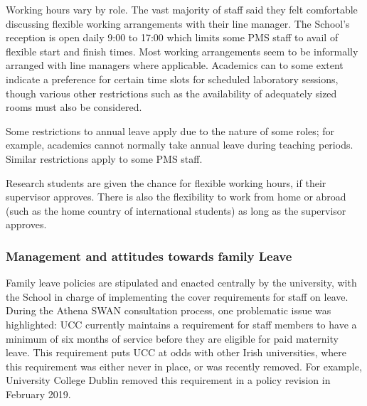 Working hours vary by role. The vast majority of staff said they felt comfortable discussing flexible working arrangements with their line manager. The School's reception is open daily 9:00 to 17:00 which limits some PMS staff to avail of flexible start and finish times. Most working arrangements seem to be informally arranged with line managers where applicable.  
Academics can to some extent indicate a preference for certain time slots for scheduled laboratory sessions, though various other restrictions such as the availability of adequately sized rooms must also be considered. 



Some restrictions to annual leave apply due to the nature of some roles; for example, academics cannot normally take annual leave during teaching periods. Similar restrictions apply to some PMS staff. 

Research students are given the chance for flexible working hours, if their supervisor approves. There is also the flexibility to work from home or abroad (such as the home country of international students) as long as the supervisor approves.

\subsubsection{Management and attitudes towards family Leave}

Family leave policies are stipulated and enacted centrally by the university, with the School  in charge of implementing the cover requirements for staff on leave. 
During the Athena SWAN consultation process, one problematic issue was highlighted:
UCC currently maintains a requirement for staff members to have a minimum of six months of service before they are eligible for paid maternity leave. This requirement puts UCC at odds with other Irish universities, where this requirement was either never in place, or was recently removed. For example, University College Dublin removed this requirement in a policy revision in February 2019. %

